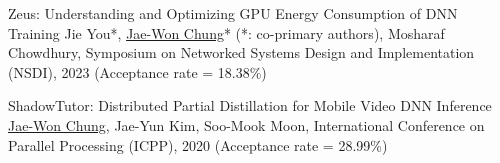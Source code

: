 



\begin{cvlist}

  \cvlistitem
    {Zeus: Understanding and Optimizing GPU Energy Consumption of DNN Training} %
    {Jie You*, \underline{Jae-Won Chung}* (*: co-primary authors), Mosharaf Chowdhury, Symposium on Networked Systems Design and Implementation (NSDI), 2023 (Acceptance rate = 18.38\%)} %

  \cvlistitem
    {ShadowTutor: Distributed Partial Distillation for Mobile Video DNN Inference} %
    {\underline{Jae-Won Chung}, Jae-Yun Kim, Soo-Mook Moon, International Conference on Parallel Processing (ICPP), 2020 (Acceptance rate = 28.99\%)} %

\end{cvlist}
